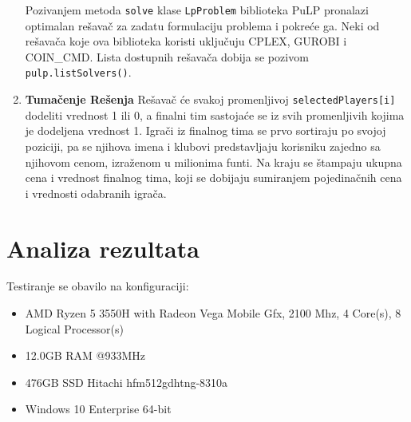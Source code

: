 \documentclass[a4paper]{article}
\begin{document}
\begin{enumerate}
  Pozivanjem metoda \texttt{solve} klase \texttt{LpProblem} biblioteka PuLP pronalazi optimalan rešavač za zadatu formulaciju problema i pokreće ga. Neki od rešavača koje ova biblioteka koristi uključuju CPLEX, GUROBI i COIN\_CMD. Lista dostupnih rešavača dobija se pozivom \texttt{pulp.listSolvers()}.
  \item  \textbf{Tumačenje Rešenja} \newline \newline
  Rešavač će svakoj promenljivoj \texttt{selectedPlayers[i]} dodeliti vrednost 1 ili 0, a finalni tim sastojaće se iz svih promenljivih kojima je dodeljena vrednost 1. Igrači iz finalnog tima se prvo sortiraju po svojoj poziciji, pa se njihova imena i klubovi predstavljaju korisniku zajedno sa njihovom cenom, izraženom u milionima funti. Na kraju se štampaju ukupna cena i vrednost finalnog tima, koji se dobijaju sumiranjem pojedinačnih cena i vrednosti odabranih igrača.
\end{enumerate} 






\section{Analiza rezultata}

Testiranje se obavilo na konfiguraciji:
\vspace{3mm} 
\begin{itemize}
	\item AMD Ryzen 5 3550H with Radeon Vega Mobile Gfx, 2100 Mhz, 4 Core(s), 8 Logical Processor(s)
	\item 12.0GB RAM @933MHz
	\item 476GB SSD Hitachi hfm512gdhtng-8310a 
	\item Windows 10 Enterprise 64-bit

\end{itemize}
\end{document}
